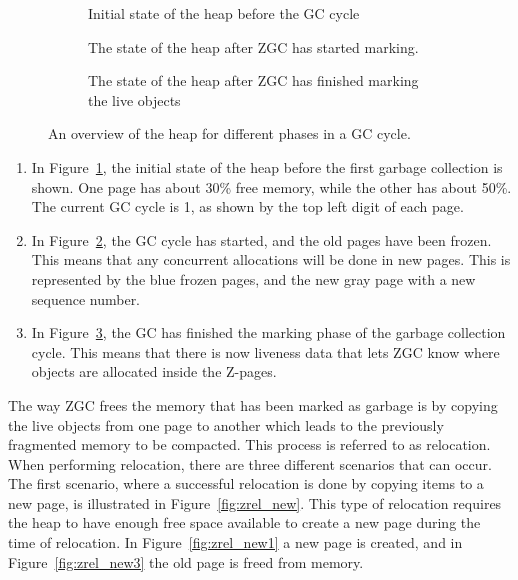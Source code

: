 \begin{figure}[H]
    \centering
    \begin{subfigure}[t]{.214\textwidth}
        \centering
        
        \caption{Initial state of the heap before the GC cycle}
        \label{fig:zrel1}
    \end{subfigure}%
    \hfill\vline\hfill
    \begin{subfigure}[t]{.32\textwidth}
        \centering
        
        \caption{The state of the heap after ZGC has started marking.}
        \label{fig:zrel2}
    \end{subfigure}%
    \hfill\vline\hfill
    \begin{subfigure}[t]{.32\textwidth}
        \centering
        
        \caption{The state of the heap after ZGC has finished marking the live objects}
        \label{fig:zrel3}
    \end{subfigure}%
    \caption{An overview of the heap for different phases in a GC cycle.}
    \label{fig:zgc_timeline}
\end{figure}

\begin{enumerate}
    \item In Figure~\ref*{fig:zrel1}, the initial state of the heap before the first garbage collection is shown. One page has about 30\% free memory, while the other has about 50\%. The current GC cycle is 1, as shown by the top left digit of each page.
    \item In Figure~\ref*{fig:zrel2}, the GC cycle has started, and the old pages have been frozen. This means that any concurrent allocations will be done in new pages. This is represented by the blue frozen pages, and the new gray page with a new sequence number.
    \item In Figure~\ref*{fig:zrel3}, the GC has finished the marking phase of the garbage collection cycle. This means that there is now liveness data that lets ZGC know where objects are allocated inside the Z-pages.
\end{enumerate}

The way ZGC frees the memory that has been marked as garbage is by copying the live objects from one page to another which leads to the previously fragmented memory to be compacted. This process is referred to as relocation. When performing relocation, there are three different scenarios that can occur. The first scenario, where a successful relocation is done by copying items to a new page, is illustrated in Figure~\ref{fig:zrel_new}. This type of relocation requires the heap to have enough free space available to create a new page during the time of relocation. In Figure~\ref{fig:zrel_new1} a new page is created, and in Figure~\ref{fig:zrel_new3} the old page is freed from memory.

